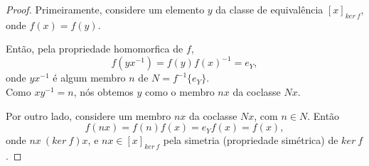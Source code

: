 \begin{definition}[Magma]
\begin{stat}
\begin{proof}
               Primeiramente, considere um elemento $y$ da classe de equivalência $[x]_{ker\ f}$, onde $f(x) = f(y)$.

               Então, pela propriedade homomorfica de $f$, $$f(yx^{-1}) = f(y)f(x)^{-1} = e_{Y},$$ onde $yx^{-1}$ é algum membro $n$ de $N=f^{-1}\{e_{Y}\}$.\\
               Como $xy^{-1} = n$, nós obtemos $y$ como o membro $nx$ da coclasse $Nx$.

               Por outro lado, considere um membro $nx$ da coclasse $Nx$, com $n \in N$. Então $$f(nx)=f(n)f(x)=e_{Y}f(x)=f(x),$$ 
               onde $nx\ (ker\ f) x$, e $nx \in [x]_{ker\ f}$ pela simetria (propriedade simétrica) de $ker\ f$.
            \end{proof}
         \end{stat}


\end{definition}
